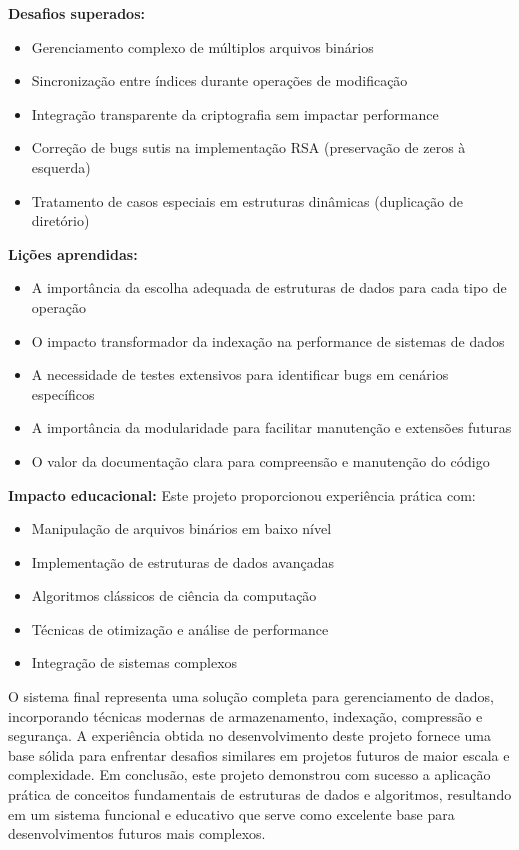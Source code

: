 \documentclass[12pt,a4paper]{article}
\begin{document}
\textbf{Desafios superados:}
\begin{itemize}
    \item Gerenciamento complexo de múltiplos arquivos binários
    \item Sincronização entre índices durante operações de modificação
    \item Integração transparente da criptografia sem impactar performance
    \item Correção de bugs sutis na implementação RSA (preservação de zeros à esquerda)
    \item Tratamento de casos especiais em estruturas dinâmicas (duplicação de diretório)
\end{itemize}

\textbf{Lições aprendidas:}
\begin{itemize}
    \item A importância da escolha adequada de estruturas de dados para cada tipo de operação
    \item O impacto transformador da indexação na performance de sistemas de dados
    \item A necessidade de testes extensivos para identificar bugs em cenários específicos
    \item A importância da modularidade para facilitar manutenção e extensões futuras
    \item O valor da documentação clara para compreensão e manutenção do código
\end{itemize}

\textbf{Impacto educacional:}
Este projeto proporcionou experiência prática com:
\begin{itemize}
    \item Manipulação de arquivos binários em baixo nível
    \item Implementação de estruturas de dados avançadas
    \item Algoritmos clássicos de ciência da computação
    \item Técnicas de otimização e análise de performance
    \item Integração de sistemas complexos
\end{itemize}

O sistema final representa uma solução completa para gerenciamento de dados, incorporando técnicas modernas de armazenamento, indexação, compressão e segurança. A experiência obtida no desenvolvimento deste projeto fornece uma base sólida para enfrentar desafios similares em projetos futuros de maior escala e complexidade.
Em conclusão, este projeto demonstrou com sucesso a aplicação prática de conceitos fundamentais de estruturas de dados e algoritmos, resultando em um sistema funcional e educativo que serve como excelente base para desenvolvimentos futuros mais complexos.
\end{document}
